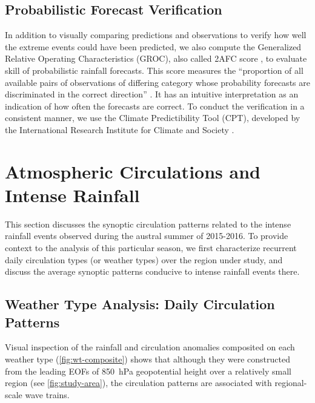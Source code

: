 \documentclass[twocol]{ametsoc}
\begin{document}
\subsection{Probabilistic Forecast Verification}

In addition to visually comparing predictions and observations to verify how well the extreme events could have been predicted, we also compute the Generalized Relative Operating Characteristics (GROC), also called 2AFC score \citep{Mason:2009kr}, to evaluate skill of probabilistic rainfall forecasts.
This score measures the ``proportion of all available pairs of observations of differing category whose probability forecasts are discriminated in the correct direction'' \citep{Mason:2009kr}.
It has an intuitive interpretation as an indication of how often the forecasts are correct.
To conduct the verification in a consistent manner, we use the Climate Predictibility Tool (CPT), developed by the International Research Institute for Climate and Society \citep{Mason:2017gg}.


\section{Atmospheric Circulations and Intense Rainfall} \label{sec:diag}

This section discusses the synoptic circulation patterns related to the intense rainfall events observed during the austral summer of 2015-2016. To provide context to the analysis of this particular season, we first characterize recurrent daily circulation types (or weather types) over the region under study, and discuss the average synoptic patterns conducive to intense rainfall events there.

\subsection{Weather Type Analysis: Daily Circulation Patterns} \label{sec:weather-types}

Visual inspection of the rainfall and circulation anomalies composited on each weather type (\cref{fig:wt-composite}) shows that although they were constructed from the leading EOFs of \SI{850}{\hecto\pascal} geopotential height over a relatively small region (see \cref{fig:study-area}), the circulation patterns are associated with regional-scale wave trains.
\end{document}
